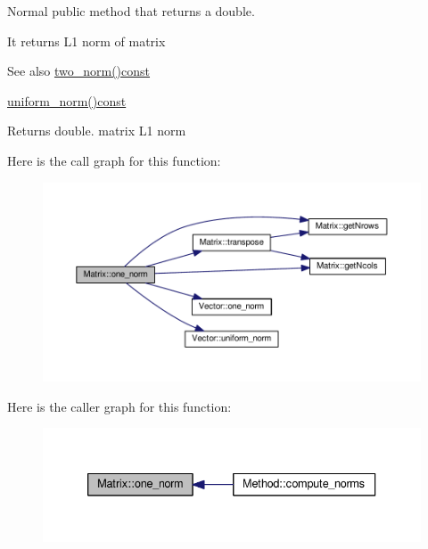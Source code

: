 Normal public method that returns a double. 

It returns L1 norm of matrix \begin{DoxySeeAlso}{See also}
\hyperlink{classMatrix_a0b738b2c1d87ec28b23c7e479d014f2a}{two\+\_\+norm()const} 

\hyperlink{classMatrix_a05777a670e901010b96e9d667a4bdd3b}{uniform\+\_\+norm()const} 
\end{DoxySeeAlso}
\begin{DoxyReturn}{Returns}
double. matrix L1 norm 
\end{DoxyReturn}


Here is the call graph for this function\+:
\nopagebreak
\begin{figure}[H]
\begin{center}
\leavevmode
\includegraphics[width=350pt]{classMatrix_a4f7ede695709b614f2e1f6423a024201_cgraph}
\end{center}
\end{figure}




Here is the caller graph for this function\+:
\nopagebreak
\begin{figure}[H]
\begin{center}
\leavevmode
\includegraphics[width=333pt]{classMatrix_a4f7ede695709b614f2e1f6423a024201_icgraph}
\end{center}
\end{figure}


